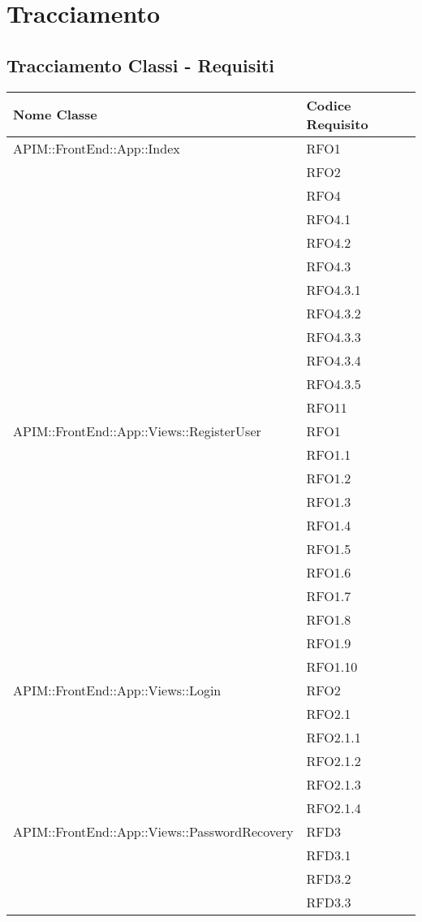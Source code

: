 \newpage
\renewcommand*{\arraystretch}{1.6}

\section{Tracciamento}

\subsection{Tracciamento Classi - Requisiti}
\begin{longtable}{ p{12cm} | p{4cm} }
	\hline \rowcolor{Gray}
	\textbf{Nome Classe} & \textbf{Codice Requisito} \\
	\hline
	APIM::FrontEnd::App::Index
	& RFO1 \\
	& RFO2 \\
	& RFO4 \\
	& RFO4.1 \\
	& RFO4.2 \\
	& RFO4.3 \\
	& RFO4.3.1 \\
	& RFO4.3.2 \\
	& RFO4.3.3 \\
	& RFO4.3.4 \\
	& RFO4.3.5 \\
	& RFO11 \\
	\hline
	APIM::FrontEnd::App::Views::RegisterUser
	& RFO1 \\
	& RFO1.1 \\
	& RFO1.2 \\
	& RFO1.3 \\
	& RFO1.4 \\
	& RFO1.5 \\
	& RFO1.6 \\
	& RFO1.7 \\
	& RFO1.8 \\
	& RFO1.9 \\
	& RFO1.10 \\
	\hline
	APIM::FrontEnd::App::Views::Login
	& RFO2 \\
	& RFO2.1 \\
	& RFO2.1.1 \\
	& RFO2.1.2 \\
	& RFO2.1.3 \\
	& RFO2.1.4 \\
	\hline
	APIM::FrontEnd::App::Views::PasswordRecovery
	& RFD3 \\
	& RFD3.1 \\
	& RFD3.2 \\
	& RFD3.3 \\

\end{longtable}
